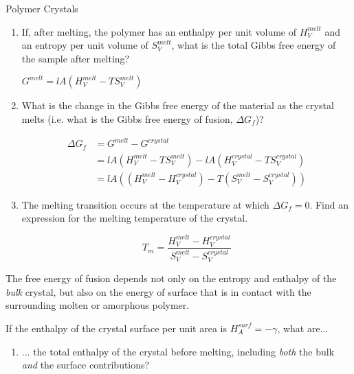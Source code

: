 \begin{activity}{Polymer Crystals}
\begin{ctqs}
\begin{enumerate}
			\item If, after melting, the polymer has an enthalpy per unit volume of $H^{melt}_V$ and an entropy per unit volume of $ S^{melt}_V$, what is the total Gibbs free energy of the sample after melting?
			
				\begin{solution}[0.5in]
					$G^{melt} = lA(  H^{melt}_V - T S^{melt}_V )$
				\end{solution}
			
			\item What is the change in the Gibbs free energy of the material as the crystal melts (i.e. what is the Gibbs free energy of fusion, $\Delta G_f$)?
			
				\begin{solution}[1.25in]
					\begin{align*}
						\Delta G_f &= G^{melt} - G^{crystal} \\
							&= lA(  H^{melt}_V - T S^{melt}_V ) - lA(  H^{crystal}_V - T S^{crystal}_V ) \\
							&= lA( (H^{melt}_V - H^{crystal}_V) - T(S^{melt}_V - S^{crystal}_V) )
					\end{align*}
				\end{solution}
			
			\item The melting transition occurs at the temperature at which $\Delta G_f = 0$.  Find an expression for the melting temperature of the crystal.
			
				\begin{solution}[1.25in]
					\begin{equation*}
						T_m = \frac{H^{melt}_V - H^{crystal}_V}{S^{melt}_V - S^{crystal}_V }
					\end{equation*}
				\end{solution}
			
		\end{enumerate}


	\question The free energy of fusion depends not only on the entropy and enthalpy of the \textit{bulk} crystal, but also on the energy of surface that is in contact with the surrounding molten or amorphous polymer.
		
		If the enthalpy of the crystal surface per unit area is $H^{surf}_A = -\gamma$, what are...
	
		\begin{enumerate}
		
			\item ... the total enthalpy of the crystal before melting, including \emph{both} the bulk \emph{and} the surface contributions?
	

\end{enumerate}
\end{ctqs}
\end{activity}

